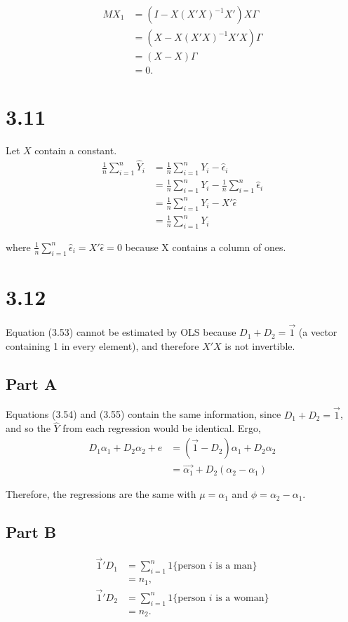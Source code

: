 \documentclass[11pt]{article} %
\begin{document}
\begin{align*}
MX_1 &= (I - X(X'X)^{-1}X')X\Gamma\\
&= (X - X(X'X)^{-1}X'X)\Gamma\\
&= (X-X)\Gamma\\
&= 0.
\end{align*}

\section{3.11}
Let $X$ contain a constant.
\begin{align*}
\frac{1}{n}\sum_{i=1}^n \hat{Y}_i &= \frac{1}{n}\sum_{i=1}^n Y_i - \hat{\epsilon}_i\\
&= \frac{1}{n}\sum_{i=1}^n Y_i  - \frac{1}{n}\sum_{i=1}^n \hat{\epsilon}_i \\
&= \frac{1}{n}\sum_{i=1}^n Y_i - X'\hat{\epsilon}\\
&=  \frac{1}{n}\sum_{i=1}^n Y_i
\end{align*}

where $\frac{1}{n}\sum_{i=1}^n \hat{\epsilon}_i  = X'\hat{\epsilon}  = 0$ because X contains a column of ones.

\section{3.12}
Equation (3.53) cannot be estimated by OLS because $D_1 + D_2 = \vec{1}$ (a vector containing 1 in every element), and therefore $X'X$ is not invertible.
\subsection{Part A}
Equations (3.54) and (3.55) contain the same information, since  $D_1 + D_2 = \vec{1}$, and so the $\hat{Y}$ from each regression would be identical. Ergo,
\begin{align*}
D_1\alpha_1 + D_2 \alpha_2 + e &= (\vec{1} - D_2)\alpha_1 + D_2 \alpha_2\\
&= \vec{\alpha_1 } +D_2(\alpha_2 - \alpha_1)
\end{align*}

Therefore, the regressions are the same with $\mu = \alpha_1$ and $\phi = \alpha_2 - \alpha_1.$
\subsection{Part B}
\begin{align*}
\vec{1}'D_1 &= \sum_{i=1}^n 1\{ \text{person $i$ is a man}\}\\
&=n_1, \\
\vec{1}'D_2 &= \sum_{i=1}^n 1\{ \text{person $i$ is a woman}\}\\
&=n_2.
\end{align*}
\end{document}
